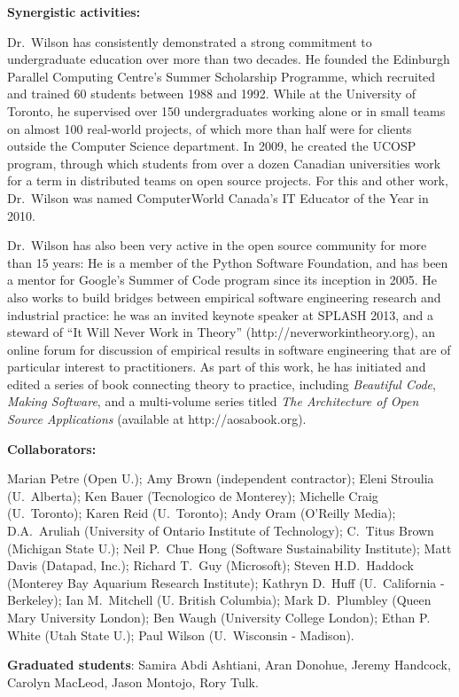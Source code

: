 \documentclass{proposalnsf}
\newlength{\up}
\begin{document}
\pagebreak

\textbf{Synergistic activities:} %

Dr.\ Wilson has consistently demonstrated a strong commitment to undergraduate education over more than two decades.
He founded the Edinburgh Parallel Computing Centre's Summer Scholarship Programme,
which recruited and trained 60 students between 1988 and 1992.
While at the University of Toronto,
he supervised over 150 undergraduates working alone or in small teams on almost 100 real-world projects,
of which more than half were for clients outside the Computer Science department.
In 2009, he created the UCOSP program,
through which students from over a dozen Canadian universities work for a term in distributed teams on open source projects.
For this and other work,
Dr.\ Wilson was named ComputerWorld Canada's IT Educator of the Year in 2010.

Dr.\ Wilson has also been very active in the open source community for more than 15 years:
He is a member of the Python Software Foundation,
and has been a mentor for Google's Summer of Code program since its inception in 2005.
He also works to build bridges between empirical software engineering research and industrial practice:
he was an invited keynote speaker at SPLASH 2013,
and a steward of ``It Will Never Work in Theory'' (http://neverworkintheory.org),
an online forum for discussion of empirical results in software engineering
that are of particular interest to practitioners.
As part of this work,
he has initiated and edited a series of book connecting theory to practice,
including \emph{Beautiful Code}, \emph{Making Software},
and a multi-volume series titled \emph{The Architecture of Open Source Applications}
(available at http://aosabook.org).

\textbf{Collaborators:} %

Marian Petre (Open U.);
Amy Brown (independent contractor);
Eleni Stroulia (U.\ Alberta);
Ken Bauer (Tecnologico de Monterey);
Michelle Craig (U.\ Toronto);
Karen Reid (U.\ Toronto);
Andy Oram (O'Reilly Media);
D.A.\ Aruliah (University of Ontario Institute of Technology);
C.\ Titus Brown (Michigan State U.);
Neil P.\ Chue Hong (Software Sustainability Institute);
Matt Davis (Datapad, Inc.);
Richard T.\ Guy (Microsoft);
Steven H.D.\ Haddock (Monterey Bay Aquarium Research Institute);
Kathryn D.\ Huff (U.\ California - Berkeley);
Ian M.\ Mitchell (U. British Columbia);
Mark D.\ Plumbley (Queen Mary University London);
Ben Waugh (University College London);
Ethan P. White (Utah State U.);
Paul Wilson (U.\ Wisconsin - Madison).

\textbf{Graduated students}: Samira Abdi Ashtiani, Aran Donohue, Jeremy Handcock, Carolyn MacLeod, Jason Montojo, Rory Tulk.
\end{document}
